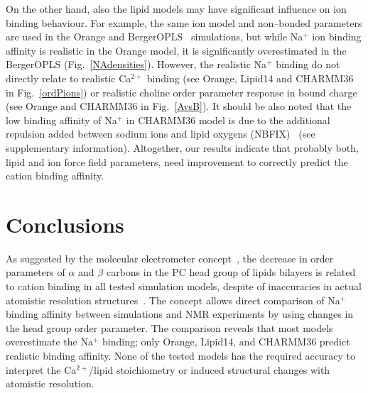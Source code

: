 \documentclass[pre,aps,floatfix,authordate1-4,twocolumn]{revtex4-1}
\begin{document}
On the other hand, also the lipid models may have significant influence on ion binding behaviour.
For example, the same ion model and non--bonded parameters are used in the Orange and BergerOPLS~\cite{tieleman06} 
simulations, but while Na$^+$ ion binding affinity is realistic in the Orange model, it is significantly overestimated 
in the BergerOPLS (Fig.~\ref{NAdensities}). However, the realistic Na$^+$ binding do not directly relate
to realistic Ca$^{2+}$ binding (see Orange, Lipid14 and CHARMM36 in Fig.~\ref{ordPions}) or realistic choline
order parameter response in bound charge (see Orange and CHARMM36 in Fig.~\ref{AvsB}).
It should be also noted that the low binding affinity of Na$^+$ in CHARMM36 model is due to 
the additional repulsion added between sodium ions and lipid oxygens (NBFIX)~\cite{venable13} (see supplementary information).
Altogether, our results indicate that probably both, lipid and ion force field parameters, need improvement to 
correctly predict the cation binding affinity. 








\section{Conclusions}
As suggested by the molecular electrometer concept~\cite{akutsu81,altenbach84,seelig87,scherer89},
the decrease in order parameters of $\alpha$ and $\beta$ carbons in the PC head group of lipids bilayers
is related to cation binding  in all tested simulation models, despite of inaccuracies 
in actual atomistic resolution structures~\cite{botan15}. The concept allows direct comparison
of Na$^+$ binding affinity between simulations and NMR experiments by using changes in the head group order parameter.
The comparison reveals that most models overestimate the Na$^+$ binding; only Orange, Lipid14, and CHARMM36 
predict realistic binding affinity. None of the tested models has the required accuracy to interpret
the Ca$^{2+}$/lipid stoichiometry or induced structural changes with atomistic resolution.
\end{document}

